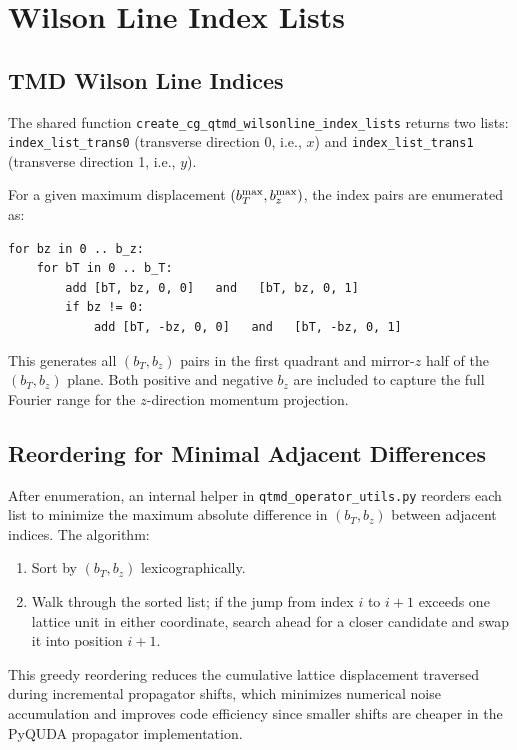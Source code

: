 \documentclass[11pt,a4paper]{article}
\begin{document}
\section{Wilson Line Index Lists}
\label{sec:wilson_lists}

\subsection{TMD Wilson Line Indices}

The shared function \verb|create_cg_qtmd_wilsonline_index_lists| returns two
lists:
\texttt{index\_list\_trans0} (transverse direction 0, i.e., $x$) and
\texttt{index\_list\_trans1} (transverse direction 1, i.e., $y$).

For a given maximum displacement $(b_T^{\rm max}, b_z^{\rm max})$, the index
pairs are enumerated as:
\begin{verbatim}
for bz in 0 .. b_z:
    for bT in 0 .. b_T:
        add [bT, bz, 0, 0]   and   [bT, bz, 0, 1]
        if bz != 0:
            add [bT, -bz, 0, 0]   and   [bT, -bz, 0, 1]
\end{verbatim}
This generates all $(b_T, b_z)$ pairs in the first quadrant and
mirror-$z$ half of the $(b_T, b_z)$ plane.  Both positive and negative $b_z$
are included to capture the full Fourier range for the $z$-direction momentum
projection.

\subsection{Reordering for Minimal Adjacent Differences}

After enumeration, an internal helper in
\verb|qtmd_operator_utils.py| reorders each list to minimize the maximum
absolute difference in $(b_T, b_z)$ between adjacent indices.  The algorithm:
\begin{enumerate}[nosep]
  \item Sort by $(b_T, b_z)$ lexicographically.
  \item Walk through the sorted list; if the jump from index $i$ to $i+1$
        exceeds one lattice unit in either coordinate, search ahead for a
        closer candidate and swap it into position $i+1$.
\end{enumerate}
This greedy reordering reduces the cumulative lattice displacement traversed
during incremental propagator shifts, which minimizes numerical noise
accumulation and improves code efficiency since smaller shifts are cheaper in
the PyQUDA propagator implementation.
\end{document}
